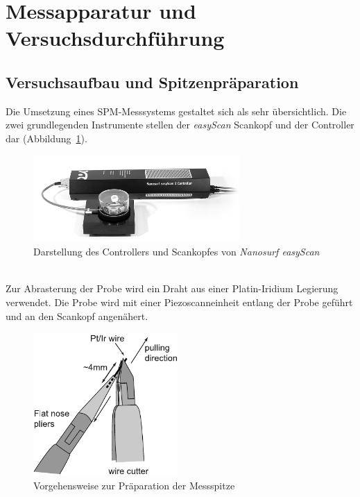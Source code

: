 \documentclass[a4paper,twoside,final]{article}
\begin{document}
\section{Messapparatur und Versuchsdurchführung} \label{sec:Versuchsdurchführung}
\subsection{Versuchsaufbau und Spitzenpräparation}
Die Umsetzung eines SPM-Messsystems gestaltet sich als sehr übersichtlich. Die zwei grundlegenden Instrumente stellen der \textit{easyScan} Scankopf und der Controller dar (Abbildung~\ref{fig:Messsystem}).\\
\begin{figure}[htp]
  \vspace{-5mm}
    \centering
    \includegraphics[width=0.7\textwidth]{Bilder/EasyScanSystem.pdf}
    \caption{Darstellung des Controllers und Scankopfes von \textit{Nanosurf easyScan}}
    \label{fig:Messsystem}
\end{figure}\\
Zur Abrasterung der Probe wird ein Draht aus einer Platin-Iridium Legierung verwendet. Die Probe wird mit einer Piezoscanneinheit entlang der Probe geführt und an den Scankopf angenähert.
\begin{figure}
  \centering
  \vspace{-5mm}
  \includegraphics[width=5.5cm]{Bilder/WireCutter.pdf}
  \caption{Vorgehensweise zur Präparation der Messspitze}
  \label{fig:Spitzenpräparation}
\end{figure}
\end{document}
